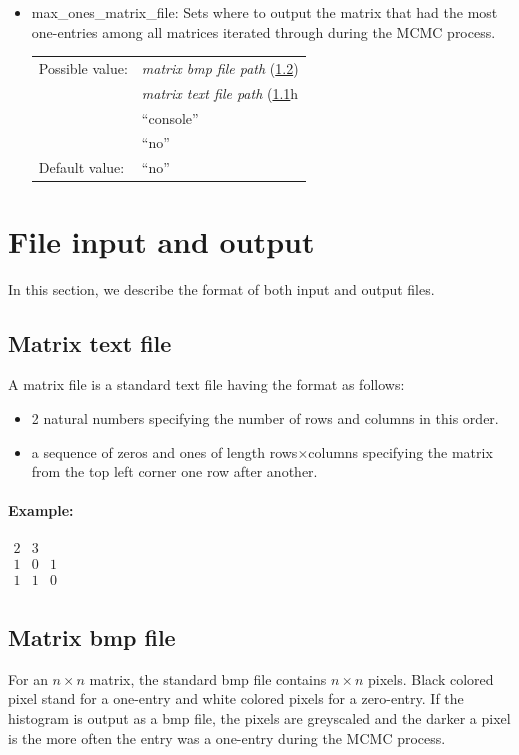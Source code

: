 \begin{itemize}
\item max\_ones\_matrix\_file: Sets where to output the matrix that had the most one-entries among all matrices iterated through during the MCMC process.

\begin{tabular}{ll}
Possible value: & \textit{matrix bmp file path} (\ref{mbf}) \\
& \textit{matrix text file path} (\ref{mtf}h \\
& ``console'' \\
& ``no'' \\
Default value: & ``no''
\end{tabular}

\end{itemize}
\section{File input and output}
In this section, we describe the format of both input and output files.

\subsection{Matrix text file}
\label{mtf}
A matrix file is a standard text file having the format as follows:
\begin{itemize}
\item 2 natural numbers specifying the number of rows and columns in this order.
\item a sequence of zeros and ones of length rows$\times$columns specifying the matrix from the top left corner one row after another.
\end{itemize}
\paragraph{Example:}
$\begin{array}{ccc}
2 & 3 & \\
1 & 0 & 1 \\
1 & 1 & 0 \\
\end{array}$

\subsection{Matrix bmp file}
\label{mbf}
For an $n\times n$ matrix, the standard bmp file contains $n\times n$ pixels. Black colored pixel stand for a one-entry and white colored pixels for a zero-entry. If the histogram is output as a bmp file, the pixels are greyscaled and the darker a pixel is the more often the entry was a one-entry during the MCMC process.

